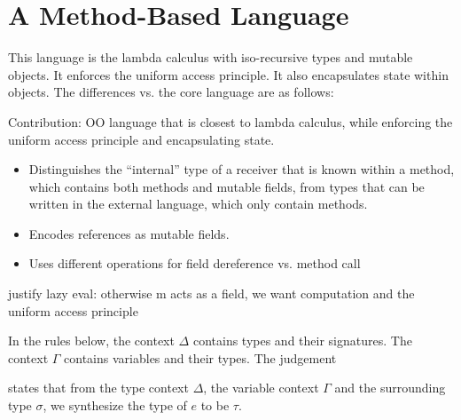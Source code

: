 \section{A Method-Based Language}

This language is the lambda calculus with iso-recursive types and mutable objects.  It enforces the uniform access principle.  It also encapsulates state within objects.  The differences vs. the core language are as follows:

Contribution: OO language that is closest to lambda calculus, while enforcing the uniform access principle and encapsulating state.

\begin{itemize}

 \item Distinguishes the ``internal'' type of a receiver that is known within a method, which contains both methods and mutable fields, from types that can be written in the external language, which only contain methods.
 
 \item Encodes references as mutable fields.
 
 \item Uses different operations for field dereference vs. method call

\end{itemize}

justify lazy eval: otherwise m acts as a field, we want computation and the uniform access principle

In the rules below, the context $\Delta$ contains types and their signatures. The context $\Gamma$ contains variables and their types. 
The judgement 


states that from the type context $\Delta$, the variable context $\Gamma$ and the surrounding type $\sigma$, we synthesize the type of $e$ to be $\tau$.



